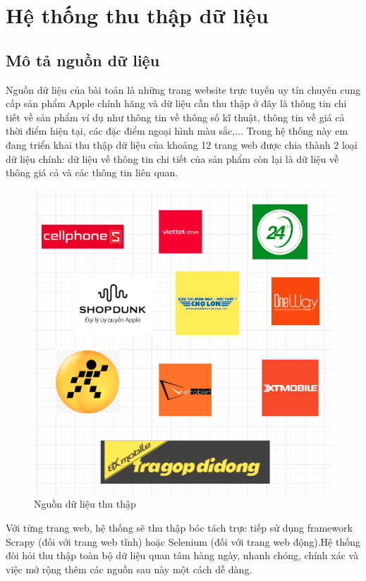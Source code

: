 \documentclass[../DoAn.tex]{subfiles}
\begin{document}
\section{Hệ thống thu thập dữ liệu}
\subsection{Mô tả nguồn dữ liệu}
Nguồn dữ liệu của bài toán là những trang website trực tuyến uy tín chuyên cung cấp sản phẩm Apple chính hãng và dữ liệu cần thu thập ở đây là thông tin chi tiết về sản phẩm ví dụ như thông tin về thông số kĩ thuật, thông tin về giá cả thời điểm hiện tại, các đặc điểm ngoại hình màu sắc,... Trong hệ thống này em đang triển khai thu thập dữ liệu của khoảng 12 trang web được chia thành 2 loại dữ liệu chính: dữ liệu về thông tin chi tiết của sản phẩm còn lại là dữ liệu về thông giá cả và các thông tin liên quan.

\begin{figure}[H]
    \centering
    \includegraphics[scale=0.7]{Hinhve/data_sources.png}
    \caption{Nguồn dữ liệu thu thập}
    \label{fig:my_label2}
\end{figure}

Với từng trang web, hệ thống sẽ thu thập bóc tách trực tiếp sử dụng framework Scrapy (đối với trang web tĩnh) hoặc Selenium (đối với trang web động).Hệ thống đòi hỏi thu thập toàn bộ dữ liệu quan tâm hàng ngày, nhanh chóng, chính xác và việc mở rộng thêm các nguồn sau này một cách dễ dàng.
\end{document}
